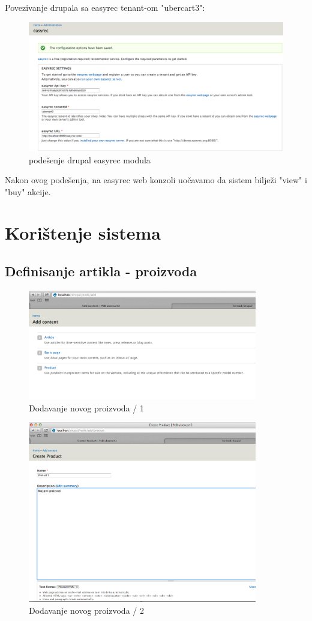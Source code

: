 \documentclass[times, utf8, seminar]{fit}
\begin{document}
{{{Povezivanje drupala sa easyrec tenant-om "ubercart3":

\begin{figure}[H]
\centering
\includegraphics[width=12cm]{img/integ_drupal.png}
\caption{podešenje drupal easyrec modula}
\end{figure}

Nakon ovog podešenja, na easyrec web konzoli uočavamo da sistem bilježi "view" i "buy" akcije.

\chapter{Korištenje sistema}
\vspace*{-0.7cm}

\section{Definisanje artikla - proizvoda}

\begin{figure}[H]
\centering
\includegraphics[width=10cm]{img/drupal_add_content_1.png}
\caption{Dodavanje novog proizvoda / 1}
\end{figure}


\begin{figure}[H]
\centering
\includegraphics[width=10cm]{img/drupal_add_content_2.png}
\caption{Dodavanje novog proizvoda / 2}
\end{figure}

}}}
\end{document}
